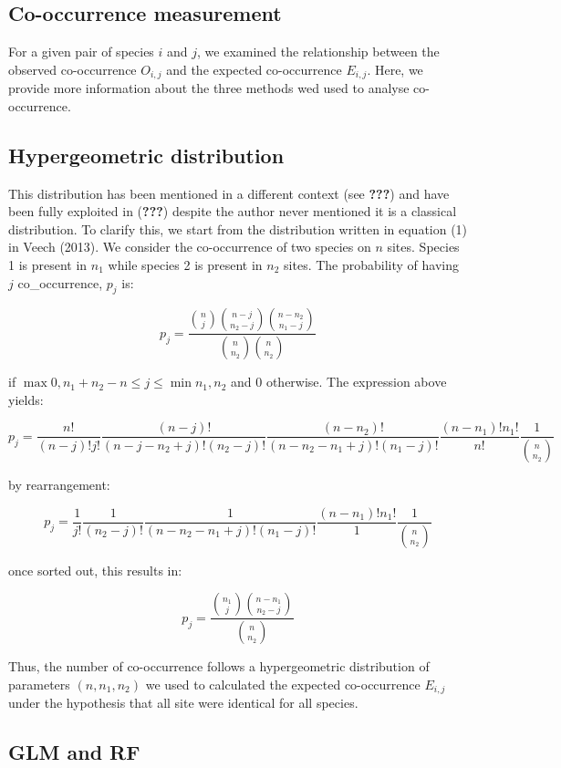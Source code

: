\subsection{Co-occurrence measurement}\label{co-occurrence-measurement}

For a given pair of species \(i\) and \(j\), we examined the
relationship between the observed co-occurrence \(O_{i,j}\) and the
expected co-occurrence \(E_{i,j}\). Here, we provide more information
about the three methods wed used to analyse co-occurrence.

\subsection{Hypergeometric
distribution}\label{hypergeometric-distribution}

This distribution has been mentioned in a different context (see
{\textbf{???}}) and have been fully exploited in ({\textbf{???}})
despite the author never mentioned it is a classical distribution. To
clarify this, we start from the distribution written in equation (1) in
Veech (2013). We consider the co-occurrence of two species on \(n\)
sites. Species 1 is present in \(n_1\) while species 2 is present in
\(n_2\) sites. The probability of having \(j\) co\_occurrence, \(p_j\)
is:

\[ p_j= \frac{\binom{n}{j} \binom{n-j}{n_2-j} \binom{n-n_2}{n_1-j}}{\binom{n}{n_2} \binom{n}{n_2}} \]

if \(\max{0, n_1+n_2-n} \leq j \leq \min{n_1, n_2}\) and 0 otherwise.
The expression above yields:

\[ p_j= \frac{n!}{(n-j)!j!} \frac{(n-j)!}{(n-j-n_2+j)!(n_2-j)!} \frac{(n-n_2)!}{(n-n_2-n_1+j)!(n_1-j)!} \frac{(n-n_1)!n_1!}{n!} \frac{1}{\binom{n}{n_2}} \]

by rearrangement:

\[ p_j= \frac{1}{j!} \frac{1}{(n_2-j)!} \frac{1}{(n-n_2-n_1+j)!(n_1-j)!} \frac{(n-n_1)!n_1!}{1} \frac{1}{\binom{n}{n_2}} \]

once sorted out, this results in:

\[ p_j= \frac{\binom{n_1}{j} \binom{n-n_1}{n_2-j}}{\binom{n}{n_2}} \]

Thus, the number of co-occurrence follows a hypergeometric distribution
of parameters \((n,n_1,n_2)\) we used to calculated the expected
co-occurrence \(E_{i,j}\) under the hypothesis that all site were
identical for all species.

\subsection{GLM and RF}\label{glm-and-rf}

